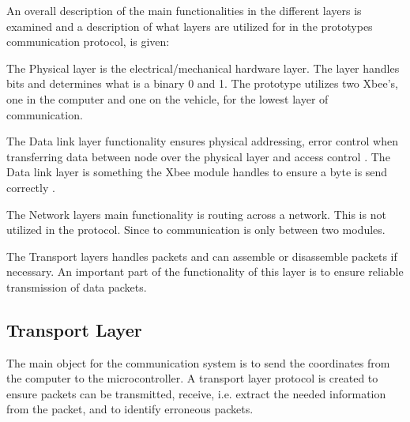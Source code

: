 An overall description of the main functionalities in the different layers is examined and a description of what layers are utilized for in the prototypes communication protocol, is given:

The Physical layer is the electrical/mechanical hardware layer. The layer handles bits and determines what is a binary 0 and 1. The prototype utilizes two Xbee's, one in the computer and one on the vehicle, for the lowest layer of communication.

The Data link layer functionality ensures physical addressing, error control when transferring data between node over the physical layer and access control \cite{JensMyerSlides}. The Data link layer is something the Xbee module handles to ensure a byte is send correctly .

The Network layers main functionality is routing across a network. This is not utilized in the protocol. Since to communication is only between two modules. 

The Transport layers handles packets and can assemble or disassemble packets if necessary. An important part of the functionality of this layer is to ensure reliable transmission of data packets.

  

 







\subsection{Transport Layer}



The main object for the communication system is to send the coordinates from the computer to the microcontroller. A transport layer protocol is created to ensure packets can be transmitted, receive, i.e. extract the needed information from the packet, and to identify erroneous packets.

